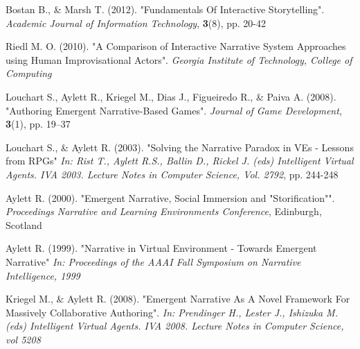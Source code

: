 \documentclass{article}
\begin{document}
\newpage
{}
\begin{thebibliography}{20}

Bostan B., \& Marsh T. (2012). 
"Fundamentals Of Interactive Storytelling". 
\textit{Academic Journal of Information Technology}, \textbf{3}(8), pp. 20-42

Riedl M. O. (2010). 
"A Comparison of Interactive Narrative System Approaches using Human Improvisational Actors".
\textit{Georgia Institute of Technology, College of Computing}

Louchart S., Aylett R., Kriegel M., Dias J., Figueiredo R., \& Paiva A. (2008).
"Authoring Emergent Narrative-Based Games".
\textit{Journal of Game Development}, \textbf{3}(1), pp. 19–37

Louchart S., \& Aylett R. (2003).
"Solving the Narrative Paradox in VEs - Lessons from RPGs"
\textit{In: Rist T., Aylett R.S., Ballin D., Rickel J. (eds) Intelligent Virtual Agents. IVA 2003. Lecture Notes in Computer Science, Vol. 2792}, pp. 244-248

Aylett R. (2000).
"Emergent Narrative, Social Immersion and "Storification"".
\textit{Proceedings Narrative and Learning Environments Conference}, Edinburgh, Scotland

Aylett R. (1999).
"Narrative in Virtual Environment - Towards Emergent Narrative"
\textit{In: Proceedings of the AAAI Fall Symposium on Narrative Intelligence, 1999}

Kriegel M., \& Aylett R. (2008).
"Emergent Narrative As A Novel Framework For Massively Collaborative Authoring".
\textit{In: Prendinger H., Lester J., Ishizuka M. (eds) Intelligent Virtual Agents. IVA 2008. Lecture Notes in Computer Science, vol 5208}


\end{thebibliography}
 
\end{document}
